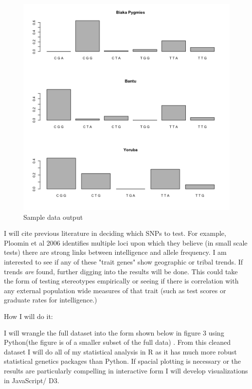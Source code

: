 \documentclass{scrartcl}
\begin{document}
\begin{figure}[h!]
  \caption{Sample data output}
  \centering
   \includegraphics[scale = .41]{figures/frequencyChart.png}
\end{figure}

I will cite previous literature in deciding which SNPs to test. For example, Ploomin et al 2006 identifies multiple loci upon which they believe (in small scale tests) there are strong links between intelligence and allele frequency. I am interested to see if any of these "trait genes" show geographic or tribal trends. If trends \textit{are} found, further digging into the results will be done. This could take the form of testing stereotypes empirically or seeing if there is correlation with any external population wide measures of that trait (such as test scores or graduate rates for intelligence.) 


\vspace{1em}
{\Large How I will do it:}
\vspace{.7em}

I will wrangle the full dataset into the form shown below in figure 3 using Python(the figure is of a smaller subset of the full data) . From this cleaned dataset I will do all of my statistical analysis in R as it has much more robust statistical genetics packages than Python. If spacial plotting is necessary or the results are particularly compelling in interactive form I will develop visualizations in JavaScript/ D3. 
\end{document}
